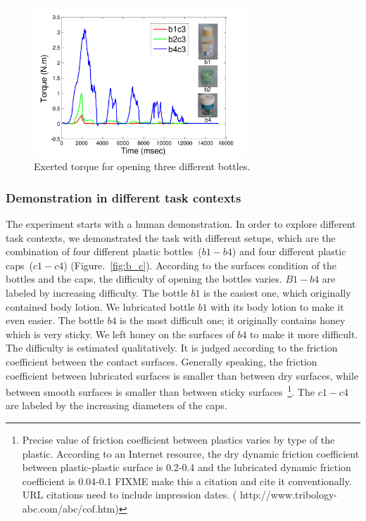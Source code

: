 \begin{figure}
  \centering
  \includegraphics[width=8cm]{./fig/b1b2b4_time_T.pdf}
  \caption{ \scriptsize{Exerted torque for opening three different bottles.}
}
\label{fig:bottlepatterns}
\end{figure}


\subsubsection{Demonstration in different task contexts}
\label{sec:exp_context}
The experiment starts with a human demonstration. In order to explore
different task contexts, we demonstrated the task with different
setups, which are the combination of four different plastic
bottles~($b1-b4$) and four different plastic caps~($c1-c4$)
(Figure.~\ref{fig:b_c}).  According to the surfaces condition of the
bottles and the caps, the difficulty of opening the bottles
varies. $B1-b4$ are labeled by increasing difficulty. The bottle $b1$
is the easiest one, which originally contained body lotion. We
lubricated bottle $b1$ with its body lotion to make it even easier. The
bottle $b4$ is the most difficult one; it originally contains honey
which is very sticky. We left honey on the surfaces of $b4$ to make
it more difficult. The difficulty is estimated qualitatively. It is
judged according to the friction coefficient between the contact
surfaces. Generally speaking, the friction coefficient between
lubricated surfaces is smaller than between dry surfaces, while
between smooth surfaces is smaller than between sticky
surfaces~\footnote{Precise value of friction coefficient between
  plastics varies by type of the plastic. According to an Internet
  resource, the dry dynamic friction coefficient between
  plastic-plastic surface is 0.2-0.4 and the lubricated dynamic
  friction coefficient is 0.04-0.1 FIXME make this a citation and cite
  it conventionally. URL citations need to include impression dates. (
  http://www.tribology-abc.com/abc/cof.htm)}. The $c1-c4$ are labeled
by the increasing diameters of the caps.

